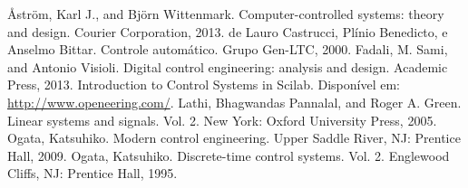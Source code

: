 \begin{thebibliography}{99}
 Åström, Karl J., and Björn Wittenmark. Computer-controlled systems: theory and design. Courier Corporation, 2013.
 de Lauro Castrucci, Plínio Benedicto, e Anselmo Bittar. Controle automático. Grupo Gen-LTC, 2000.
 Fadali, M. Sami, and Antonio Visioli. Digital control engineering: analysis and design. Academic Press, 2013.
 Introduction to Control Systems in Scilab. Disponível em: \url{http://www.openeering.com/}.
 Lathi, Bhagwandas Pannalal, and Roger A. Green. Linear systems and signals. Vol. 2. New York: Oxford University Press, 2005.
 Ogata, Katsuhiko. Modern control engineering. Upper Saddle River, NJ: Prentice Hall, 2009.
 Ogata, Katsuhiko. Discrete-time control systems. Vol. 2. Englewood Cliffs, NJ: Prentice Hall, 1995.

\end{thebibliography}

\pagebreak